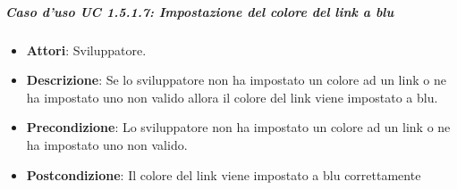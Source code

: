 \subparagraph{Caso d'uso UC 1.5.1.7: Impostazione del colore del link a blu}


\FloatBarrier
\begin{itemize}
\item\textbf{Attori}: Sviluppatore.
\item\textbf{Descrizione}:  Se lo sviluppatore non ha impostato un colore ad un link o ne ha impostato uno non valido allora il colore del link viene impostato a blu.
\item\textbf{Precondizione}: Lo sviluppatore non ha impostato un colore ad un link o ne ha impostato uno non valido.
\item\textbf{Postcondizione}: Il colore del link viene impostato a blu correttamente

\end{itemize}

